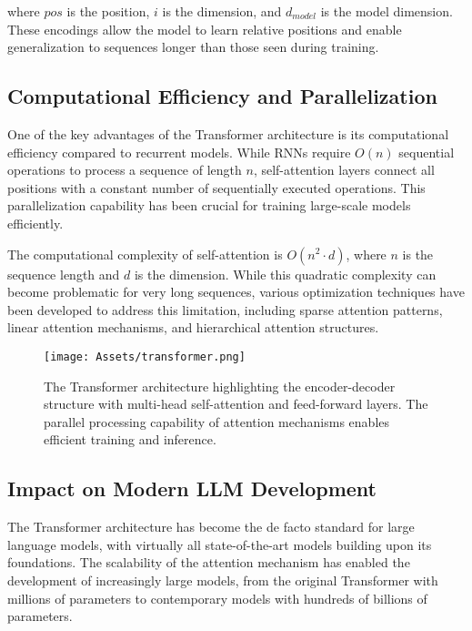 where $pos$ is the position, $i$ is the dimension, and $d_{model}$ is the model dimension. These encodings allow the model to learn relative positions and enable generalization to sequences longer than those seen during training.

\subsection{Computational Efficiency and Parallelization}

One of the key advantages of the Transformer architecture is its computational efficiency compared to recurrent models. While RNNs require $O(n)$ sequential operations to process a sequence of length $n$, self-attention layers connect all positions with a constant number of sequentially executed operations. This parallelization capability has been crucial for training large-scale models efficiently.

The computational complexity of self-attention is $O(n^2 \cdot d)$, where $n$ is the sequence length and $d$ is the dimension. While this quadratic complexity can become problematic for very long sequences, various optimization techniques have been developed to address this limitation, including sparse attention patterns, linear attention mechanisms, and hierarchical attention structures.

\begin{figure}[H]
    \centering
    \texttt{[image: Assets/transformer.png]}
    \caption{The Transformer architecture highlighting the encoder-decoder structure with multi-head self-attention and feed-forward layers. The parallel processing capability of attention mechanisms enables efficient training and inference.}
    \label{fig:transformer_architecture}
\end{figure}

\subsection{Impact on Modern LLM Development}

The Transformer architecture has become the de facto standard for large language models, with virtually all state-of-the-art models building upon its foundations. The scalability of the attention mechanism has enabled the development of increasingly large models, from the original Transformer with millions of parameters to contemporary models with hundreds of billions of parameters.



